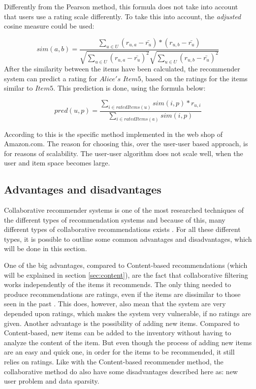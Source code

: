 Differently from the Pearson method, this formula does not take into account that users use a rating scale differently. To take this into account, the \textit{adjusted} cosine measure could be used:

\[
	sim(a,b) = \frac{\sum_{u \in U}(r_{u,a} - \bar{r_{u}})*(r_{u,b} - \bar{r_{u}})}{\sqrt{\sum_{u \in U}(r_{u,a} - \bar{r_{u}})^2}\sqrt{\sum_{u \in U} (r_{u,b} - \bar{r_{u}})^2}}
\]
After the similarity between the items have been calculated, the recommender system can predict a rating for \(Alice's\) \(Item5\), based on the ratings for the items similar to \(Item5\). This prediction is done, using the formula below:

\[
	pred(u,p) = \frac{\sum_{i\in ratedItems(u)} sim(i,p) * r_{u,i}}{\sum_{i \in ratedItems(a)} sim(i,p)}
\]

According to \citet{AmazonRecommendations} this is the specific method implemented in the web shop of Amazon.com. The reason for choosing this, over the user-user based approach, is for reasons of scalability. The user-user algorithm does not scale well, when the user and item space becomes large. 

\subsection{Advantages and disadvantages}
\label{subsec:collaborativeAdvantages}
Collaborative recommender systems is one of the most researched techniques of the different types of recommendation systems and because of this, many different types of collaborative recommendations exists \citep{IntroductionRecommenderSystems}. For all these different types, it is possible to outline some common advantages and disadvantages, which will be done in this section.\newline

One of the big advantages, compared to Content-based recommendations (which will be explained in section \ref{sec:content}), are the fact that collaborative filtering works independently of the items it recommends. The only thing needed to produce recommendations are ratings, even if the items are dissimilar to those seen in the past \citep[p. 18]{TowardsTheNextGenerationOfRs}. This does, however, also mean that the system are very depended upon ratings, which makes the system very vulnerable, if no ratings are given. \newline
Another advantage is the possibility of adding new items. Compared to Content-based, new items can be added to the inventory without having to analyze the content of the item. But even though the process of adding new items are an easy and quick one, in order for the items to be recommended, it still relies on ratings.\newline 
Like with the Content-based recommender method, the collaborative method do also have some disadvantages described here as: new user problem and data sparsity.\newline


